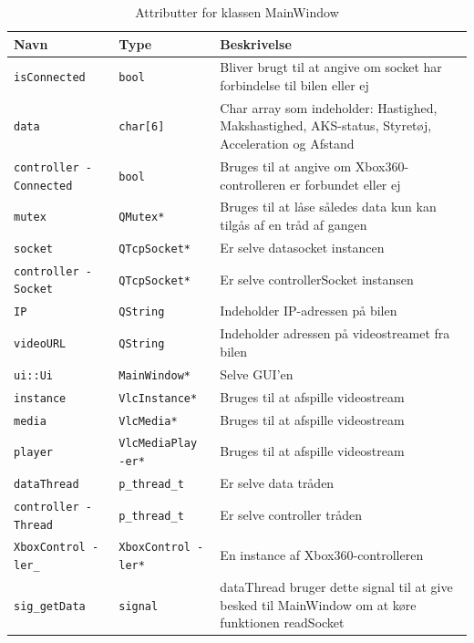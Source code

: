 \begin{table}[H]
\begin{tabularx}{\textwidth}{| Z | Z | L{10cm} |} \hline
Navn & Type & Beskrivelse \\\hline
\texttt{isConnected}         & \texttt{bool}           &Bliver brugt til at angive om socket har forbindelse til bilen eller ej \\\hline
\texttt{data}                & \texttt{char[6]}        &Char array som indeholder: Hastighed, Makshastighed, AKS-status, Styretøj, Acceleration og Afstand\\\hline
\texttt{controller -Connected} & \texttt{bool}           &Bruges til at angive om Xbox360-controlleren er forbundet eller ej\\\hline
\texttt{mutex}               & \texttt{QMutex*}        &Bruges til at låse således data kun kan tilgås af en tråd af gangen\\\hline
\texttt{socket}              & \texttt{QTcpSocket*}    &Er selve datasocket instancen\\\hline
\texttt{controller -Socket}    & \texttt{QTcpSocket*}    &Er selve controllerSocket instansen\\\hline
\texttt{IP}                  & \texttt{QString}        &Indeholder IP-adressen på bilen\\\hline
\texttt{videoURL}            & \texttt{QString}        &Indeholder adressen på videostreamet fra bilen\\\hline
\texttt{ui::Ui}              & \texttt{MainWindow*}    &Selve GUI'en\\\hline
\texttt{instance}            & \texttt{VlcInstance*}   &Bruges til at afspille videostream\\\hline
\texttt{media}               & \texttt{VlcMedia*}      &Bruges til at afspille videostream\\\hline
\texttt{player}              & \texttt{VlcMediaPlay -er*}&Bruges til at afspille videostream\\\hline
\texttt{dataThread}          & \texttt{p\_thread\_t}     &Er selve data tråden\\\hline
\texttt{controller -Thread}    & \texttt{p\_thread\_t}     &Er selve controller tråden\\\hline
\texttt{XboxControl -ler\_}     & \texttt{XboxControl -ler*}&En instance af Xbox360-controlleren\\\hline
\texttt{sig\_getData}     & \texttt{signal}&dataThread bruger dette signal til at give besked til MainWindow om at køre funktionen readSocket \\\hline

\end{tabularx}
\caption{Attributter for klassen MainWindow}
\label{table:attr_distancesensor}
\end{table}

